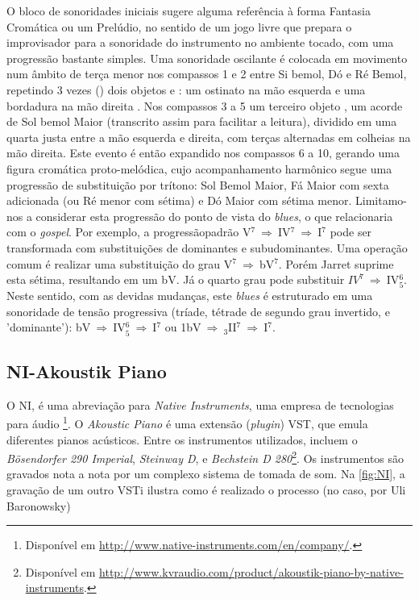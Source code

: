 O bloco de sonoridades iniciais  sugere alguma referência à forma Fantasia Cromática ou um Prelúdio, no sentido de um jogo livre que prepara o improvisador para a sonoridade do instrumento no ambiente tocado, com uma progressão bastante simples.  Uma sonoridade oscilante é colocada em movimento num âmbito de terça menor nos compassos 1 e 2 entre Si bemol, Dó e Ré Bemol, repetindo 3 vezes () dois objetos  e : um ostinato na mão esquerda e uma bordadura na mão direita . Nos compassos 3 a 5 um terceiro objeto , um acorde de Sol bemol Maior (transcrito assim para facilitar a leitura), dividido em uma quarta justa entre a mão esquerda e direita, com terças alternadas em colheias na mão direita. Este evento é então expandido nos compassos 6 a 10, gerando uma figura cromática proto-melódica, cujo acompanhamento harmônico segue uma progressão de substituição por trítono: Sol Bemol Maior, Fá Maior com sexta adicionada (ou Ré menor com sétima) e Dó Maior com sétima menor. Limitamo-nos a considerar esta progressão do ponto de vista do \emph{blues}, o que relacionaria com o \emph{gospel}. Por exemplo, a progressãopadrão  V$^7~\Rightarrow~$IV$^7~\Rightarrow~$I$^7$ pode ser transformada com substituições de dominantes e subudominantes. Uma operação comum é realizar uma substituição do grau V$^7~\Rightarrow~$bV$^7$. Porém Jarret suprime esta sétima, resultando em um bV. Já o quarto grau pode substituir  $IV^7~\Rightarrow~$IV$^6_5$. Neste sentido, com as devidas mudanças, este \emph{blues} é estruturado em uma sonoridade de tensão progressiva (tríade, tétrade de segundo grau invertido, e 'dominante'):  bV$~\Rightarrow~$IV$^6_5~\Rightarrow~$I$^7$ ou 1bV$~\Rightarrow~_3$II$^7~\Rightarrow~$I$^7$. 

\subsection{NI-Akoustik Piano}\label{sec:NI}

O NI, é uma abreviação para \emph{Native Instruments}, uma empresa de tecnologias para áudio \footnote{Disponível em \url{http://www.native-instruments.com/en/company/}.}. O \emph{Akoustic Piano} é uma extensão (\emph{plugin}) VST, que emula diferentes pianos acústicos. Entre os instrumentos utilizados, incluem o \emph{Bösendorfer 290 Imperial}, \emph{Steinway D}, e \emph{Bechstein D 280}\footnote{Disponível em \url{http://www.kvraudio.com/product/akoustik-piano-by-native-instruments}.}. Os instrumentos são gravados nota a nota por um complexo sistema de tomada de som. Na \autoref{fig:NI}, a gravação de um outro VSTi ilustra como é realizado o processo (no caso, por Uli Baronowsky)

